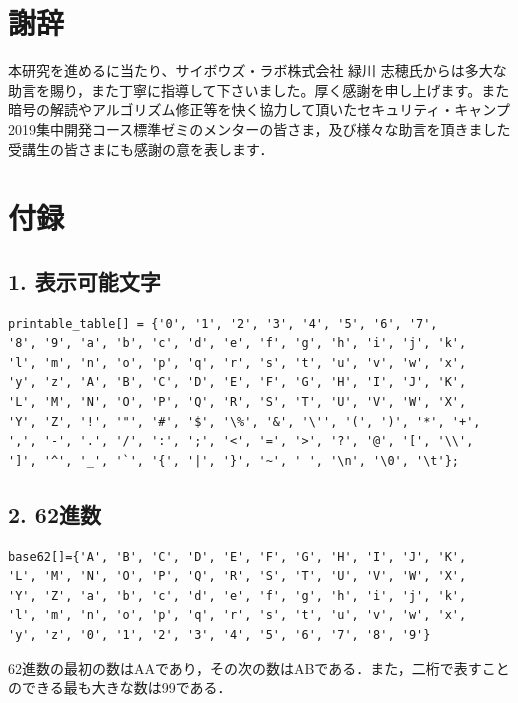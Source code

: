 \documentclass[titlepage]{jarticle}
\begin{document}
\section{謝辞}
本研究を進めるに当たり、サイボウズ・ラボ株式会社 緑川 志穂氏からは多大な助言を賜り，また丁寧に指導して下さいました。厚く感謝を申し上げます。また暗号の解読やアルゴリズム修正等を快く協力して頂いたセキュリティ・キャンプ2019集中開発コース標準ゼミのメンターの皆さま，及び様々な助言を頂きました受講生の皆さまにも感謝の意を表します．

\section{付録}
\subsection{1. 表示可能文字}
\begin{verbatim}
printable_table[] = {'0', '1', '2', '3', '4', '5', '6', '7', 
'8', '9', 'a', 'b', 'c', 'd', 'e', 'f', 'g', 'h', 'i', 'j', 'k', 
'l', 'm', 'n', 'o', 'p', 'q', 'r', 's', 't', 'u', 'v', 'w', 'x', 
'y', 'z', 'A', 'B', 'C', 'D', 'E', 'F', 'G', 'H', 'I', 'J', 'K', 
'L', 'M', 'N', 'O', 'P', 'Q', 'R', 'S', 'T', 'U', 'V', 'W', 'X', 
'Y', 'Z', '!', '"', '#', '$', '\%', '&', '\'', '(', ')', '*', '+', 
',', '-', '.', '/', ':', ';', '<', '=', '>', '?', '@', '[', '\\', 
']', '^', '_', '`', '{', '|', '}', '~', ' ', '\n', '\0', '\t'};
\end{verbatim}

\subsection{2. 62進数}
\begin{verbatim}
base62[]={'A', 'B', 'C', 'D', 'E', 'F', 'G', 'H', 'I', 'J', 'K', 
'L', 'M', 'N', 'O', 'P', 'Q', 'R', 'S', 'T', 'U', 'V', 'W', 'X', 
'Y', 'Z', 'a', 'b', 'c', 'd', 'e', 'f', 'g', 'h', 'i', 'j', 'k', 
'l', 'm', 'n', 'o', 'p', 'q', 'r', 's', 't', 'u', 'v', 'w', 'x', 
'y', 'z', '0', '1', '2', '3', '4', '5', '6', '7', '8', '9'}
\end{verbatim}
62進数の最初の数はAAであり，その次の数はABである．また，二桁で表すことのできる最も大きな数は99である．
\end{document}
